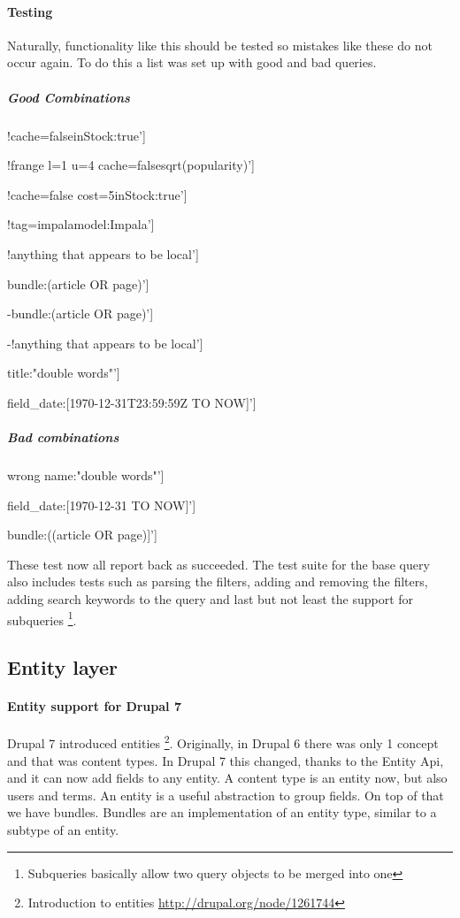 \paragraph{Testing}
Naturally, functionality like this should be tested so mistakes like these do not occur again. To do this a list was set up with good and bad queries.

\subparagraph{Good Combinations}
\begin{packed_itemize}
\item {!cache=false}inStock:true']
\item {!frange l=1 u=4 cache=false}sqrt(popularity)']
\item {!cache=false cost=5}inStock:true']
\item {!tag=impala}model:Impala']
\item {!anything that appears to be local}']
\item bundle:(article OR page)']
\item -bundle:(article OR page)']
\item -{!anything that appears to be local}']
\item title:"double words"']
\item field\_date:[1970-12-31T23:59:59Z TO NOW]'] 
\end{packed_itemize}

\subparagraph{Bad combinations}
\begin{packed_itemize}
\item wrong name:"double words"']
\item field\_date:[1970-12-31 TO NOW]']
\item bundle:((article OR page)]']
\end{packed_itemize}

These test now all report back as succeeded. The test suite for the base query also includes tests such as parsing the filters, adding and removing the filters, adding search keywords to the query and last but not least the support for subqueries \footnote{Subqueries basically allow two query objects to be merged into one}.

\subsection{Entity layer}
\paragraph{Entity support for Drupal 7}
Drupal 7 introduced entities \footnote{Introduction to entities \url{http://drupal.org/node/1261744}}. 
Originally, in Drupal 6 there was only 1 concept and that was content types. In Drupal 7 this changed, thanks to the Entity Api, and it can now add fields to any entity. A content type is an entity now, but also users and terms. An entity is a useful abstraction to group fields. On top of that we have bundles. Bundles are an implementation of an entity type, similar to a subtype of an entity.

